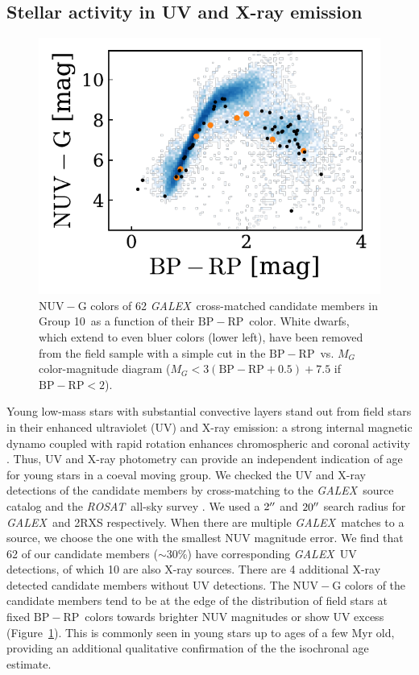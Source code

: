 \documentclass[modern,letterpaper]{aastex61}
\newcommand{\project}[1]{\textsl{#1}}
\newcommand{\acronym}[1]{{\small{#1}}}
\newcommand{\galex}{\project{\acronym{GALEX}}}
\newcommand{\rosat}{\project{\acronym{ROSAT}}}
\newcommand{\figname}{Figure}
\newcommand{\groupTen}{Group 10}
\newcommand{\bprp}{\ensuremath{\mathrm{BP}-\mathrm{RP}}}
\begin{document}
\subsection{Stellar activity in UV and X-ray emission}

\begin{figure}
  \centering
  \includegraphics{nuv_xray.pdf}
  \caption{$\mathrm{NUV}-\mathrm{G}$ colors of 62 \galex\ cross-matched
    candidate members in \groupTen\ as a function of their \bprp\ color.
    White dwarfs, which extend to even bluer colors (lower left), have been removed from the field sample with a simple cut in the
    \bprp\ vs. $M_G$ color-magnitude diagram ($M_G< 3(\bprp+0.5)+7.5$ if $\bprp<2$).
    }
  \label{fig:nuv}
\end{figure}

Young low-mass stars with substantial convective layers stand out from
field stars in their enhanced ultraviolet (UV) and X-ray emission:
a strong internal magnetic dynamo coupled with rapid rotation enhances chromospheric and coronal activity
\citep{2004ARA&A..42..685Z,2008hsf2.book..757T,2011ApJ...727....6S,2013ApJ...774..101R}.
Thus, UV and X-ray photometry can provide an independent indication of age
for young stars in a coeval moving group.
We checked the UV and X-ray detections of
the candidate members by cross-matching to the \galex\ source catalog
\citep{2005ApJ...619L...1M} and the \rosat\ all-sky survey
\citep[2RXS;][]{2016A&A...588A.103B}.
We used a $2\mbox{$^{\prime\prime}$}$ and $20\mbox{$^{\prime\prime}$}$ search radius for \galex\ and 2RXS respectively.
When there are multiple \galex\ matches to a source, we choose the one with
the smallest NUV magnitude error.
We find that 62 of our candidate members ($\sim30$\%) have corresponding \galex\
UV detections, of which 10 are also X-ray sources.
There are 4 additional X-ray detected candidate members without UV detections.
The $\mathrm{NUV}-\mathrm{G}$ colors of the candidate members tend
to be at the edge of the distribution of field stars
at fixed \bprp\ colors towards brighter
$\mathrm{NUV}$ magnitudes or show UV excess (\figname~\ref{fig:nuv}).
This is commonly seen in young stars up to ages of a few Myr old,
providing an additional qualitative confirmation of the the isochronal age estimate.
\end{document}
